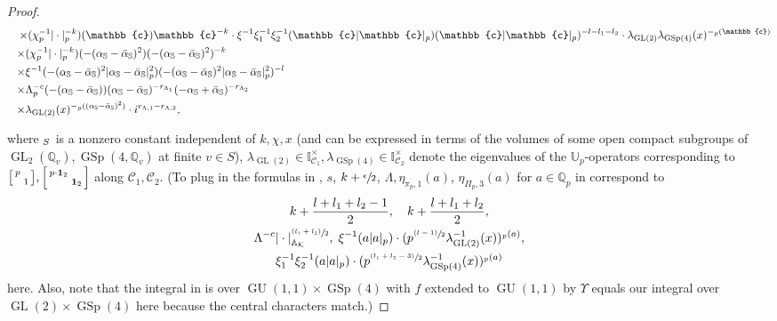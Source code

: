 \documentclass[JEP,XML,SOM,Unicode,published]{cedram}
\newcommand{\NoChangel}[1]{%
\expandafter\let\csname old\string#1\endcsname=#1
\let#1=\relax
\newcommand{#1}{\mathop{\mathcode`l="716C\csname old\string#1\endcsname\mathcode`l="7160}\displaylimits}%
}
\newenvironment{smallbmatrix}{\big[\begin{smallmatrix}}{\end{smallmatrix}\big]}
\newenvironment{Smallbmatrix}{\Big[\begin{smallmatrix}}{\end{smallmatrix}\Big]}
\newcommand{\psfrac}[2]{\sfrac{(#1)}{#2}}
\theoremstyle{plain}
\theoremstyle{remark}
\newcommand{\bA}{\mathbb{A}}
\newcommand{\bI}{\mathbb{I}}
\newcommand{\bQ}{\mathbb{Q}}
\newcommand{\bU}{\mathbb{U}}
\newcommand{\bbc}{\mathbb{c}}
\newcommand{\cK}{\mathcal{K}}
\newcommand{\sC}{\mathscr{C}}
\DeclareMathOperator{\GL}{GL}
\DeclareMathOperator{\GSp}{GSp}
\DeclareMathOperator{\GU}{GU}
\newcommand{\val}{\mathrm{val}}\NoChangel{\val}
\newcommand{\vol}{\mathrm{vol}}\NoChangel{\vol}
\newcommand{\bid}{\mathbf{1}}
\newcommand{\alphaS}{\alpha_{\mathbb{S}}}
\newcommand{\alphabS}{\bar{\alpha}_{\mathbb{S}}}
\newcommand{\sPi}{\scriptscriptstyle{\Pi}}
\newcommand{\sLambda}{\scriptscriptstyle{\Lambda}}
\begin{document}
\begin{proof}
\begin{minipage}{\textwidth}
\begin{multline}
\shoveleft{\hspace*{1mm}\times(\chi^{-1}_p|\cdot|^{-k}_p)(\bbc) \bbc^{-k} \cdot \xi^{-1}\xi^{-1}_1\xi^{-1}_2(\bbc|\bbc|_p) (\bbc|\bbc|_p)^{-l-l_1-l_2}\cdot \lambda_{\GL(2)}\lambda_{\GSp(4)}(x)^{-\val_p(\bbc)}} \\
\shoveleft{\hspace*{.2mm}\times(\chi^{-1}_p|\cdot|^{-k}_p)(-(\alphaS-\alphabS)^2)(-(\alphaS-\alphabS)^2)^{-k}} \\
\shoveleft{\hspace*{.2mm}\times \xi^{-1}(-(\alphaS-\alphabS)^2|\alphaS-\alphabS|^2_p)(-(\alphaS-\alphabS)^2|\alphaS-\alphabS|^2_p)^{-l}}\\
\shoveleft{\hspace*{.2mm}\times\Lambda^{-c}_p(-(\alphaS-\alphabS))(\alphaS-\alphabS)^{-r_{\sLambda_1}}(-\alphaS+\alphabS)^{-r_{\sLambda_2}}}\\
\shoveleft{\hspace*{.2mm}\times \lambda_{\GL(2)}(x)^{-\val_p((\alphaS-\alphabS)^2)}\cdot i^{r_{\sLambda,1}-r_{\sLambda,2}},\hfill\mbox{}}
\end{multline}
\end{minipage}
\par\smallskip\noindent
where $\vol_S$ is a nonzero constant independent of $k,\chi,x$ (and can be expressed in terms of the volumes of some open compact subgroups of $\GL_2(\bQ_v),\GSp(4,\bQ_v)$ at finite $v\in S$), $\lambda_{\GL(2)}\in \bI^\times_{\sC_1},\lambda_{\GSp(4)}\in\bI^\times_{\sC_2}$ denote the eigenvalues of the $\bU_p$-operators corresponding to $\begin{smallbmatrix}p\\&1\end{smallbmatrix},\begin{Smallbmatrix}p\cdot\bid_2\\&\bid_2\end{Smallbmatrix}$ along $\sC_1,\sC_2$. (To plug in the formulas in \cite{pFL}, $s$, $k+\sfrac{\epsilon}{2}$, $\Lambda,\eta_{\pi_p,1}(a)$, $\eta_{\sPi_p,3}(a)$ for $a\in\bQ_p$ in \loccit correspond to
\begin{gather*}
k+\frac{l+l_1+l_2-1}{2},\quad k+\frac{l+l_1+l_2}{2},\\
{\Lambda^{-c}|\cdot|^{\psfrac{l_1+l_2}{2}}_{\bA_\cK}},\; \xi^{-1}(a|a|_p)\cdot(p^{\psfrac{l-1}{2}}\lambda^{-1}_{\GL(2)}(x))^{\val_p(a)},\\\xi^{-1}_1\xi^{-1}_2(a|a|_p)\cdot (p^{\psfrac{l_1+l_2-3}{2}}\lambda^{-1}_{\GSp(4)}(x))^{\val_p(a)}
\end{gather*}
here. Also, note that the integral in \loccit is over $\GU(1,1)\times\GSp(4)$ with $f$ extended to $\GU(1,1)$ by $\Upsilon$ equals our integral over $\GL(2)\times\GSp(4)$ here because the central characters match.)


\end{proof}
\end{document}

